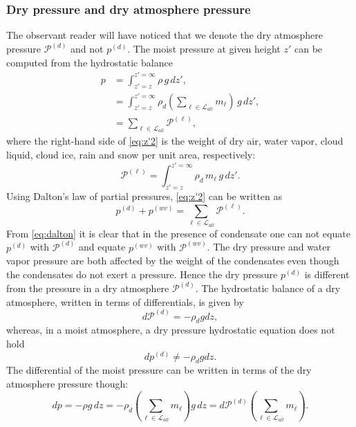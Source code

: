 \documentclass{agujournal}
\begin{document}
{\subsubsection{Dry pressure and dry atmosphere pressure}
The observant reader will have noticed that we denote the dry atmosphere pressure $\mathcal{P}^{(d)}$ and not $p^{(d)}$. The moist pressure at given height $z'$ can be computed from the hydrostatic balance
\begin{align}
p&=\int^{z'=\infty}_{z'=z}\rho\, g\, dz',\\
 &=\int^{z'=\infty}_{z'=z}\rho_d \left( \sum_{\ell \in \mathcal{L}_{all}} m_\ell \right)\, g\, dz',\\
 &=\sum_{\ell \in \mathcal{L}_{all}} \mathcal{P}^{(\ell)},\label{eq:z'2}
\end{align}
where the right-hand side of \eqref{eq:z'2} is the weight of dry air, water vapor, cloud liquid, cloud ice, rain and snow per unit area, respectively:
\begin{equation}
{\mathcal{P}}^{(\ell)}=\int^{z'=\infty}_{z'=z}\rho_d \, m_\ell \, g\, dz'\label{eq:z'}.
\end{equation}
Using Dalton's law of partial pressures, \eqref{eq:z'2} can be written as
\begin{equation}
p^{(d)}+p^{(wv)}=\sum_{\ell \in \mathcal{L}_{all}} {\mathcal{P}}^{(\ell)}.\label{eq:dalton}
\end{equation}
From \eqref{eq:dalton} it is clear that in the presence of condensate one can not equate $p^{(d)}$ with ${\mathcal{P}}^{(d)}$ and equate $p^{(wv)}$ with ${\mathcal{P}}^{(wv)}$. The dry pressure and water vapor pressure are both affected by the weight of the condensates even though the condensates do not exert a pressure. Hence the dry pressure $p^{(d)}$ is different from the pressure in a dry atmosphere $\mathcal{P}^{(d)}$. The hydrostatic balance of a dry atmosphere, written in terms of differentials, is given by
\begin{equation}
d\mathcal{P}^{(d)}=-\rho_d g dz,\label{eq:dry_atm_hydro}
\end{equation}
whereas, in a moist atmosphere, a dry pressure hydrostatic equation does not hold
\begin{equation}
dp^{(d)}\ne -\rho_d g dz.
\end{equation}
The differential of the moist pressure can be written in terms of the dry atmosphere pressure though:
\begin{equation}
dp=-\rho g \, dz = -\rho_d \left( \sum_{\ell \in \mathcal{L}_{all}} m_\ell\right)g\, dz = d\mathcal{P}^{(d)}\left( \sum_{\ell \in \mathcal{L}_{all}} m_\ell\right).
\end{equation}

}
\end{document}
